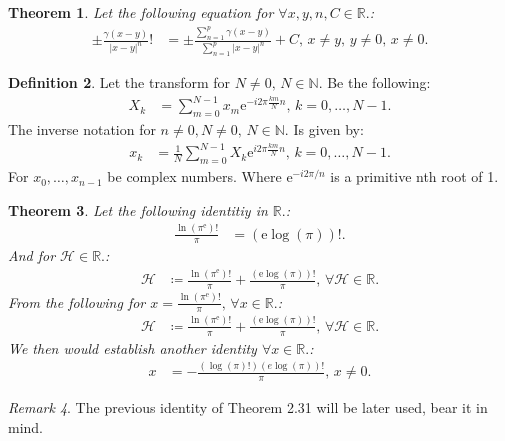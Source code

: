 \documentclass[10pt]{article}
\theoremstyle{plain}
\newtheorem{theorem}{Theorem}[section]
\theoremstyle{definition}
\newtheorem{definition}[theorem]{Definition}
\theoremstyle{remark}
\newtheorem{remark}[theorem]{Remark}
\begin{document}
\begin{theorem}
	Let the following equation for $\forall x, y, n, C \in \mathbb{R}.$:
	\begin{align*}
		\pm \frac{\gamma(x-y)}{|x - y|^{n}}! &= \pm \frac{\sum_{n=1}^{p}\gamma(x-y)}{\sum_{n=1}^{p}|x - y|^{n}} + C, \, x \neq y, \, y \neq 0, \, x \neq 0.
	\end{align*}
\end{theorem}

\begin{definition}
	Let the transform for $N \neq 0, \, N \in \mathbb{N}.$ Be the following:
	\begin{align*}
		X_k &= \sum_{m=0}^{N-1} x_{m}\mathrm{e}^{-i2\pi \frac{km}{N}n}, \, k = 0,\dots,N-1.
	\end{align*}
	The inverse notation for $n \neq 0, N \neq 0, \, N \in \mathbb{N}.$ Is given by:
	\begin{align*}
		x_k &= \frac{1}{N} \sum_{m=0}^{N-1} X_k \mathrm{e}^{i2\pi \frac{km}{N}n}, \, k = 0,\dots,N-1.
	\end{align*}
	For $x_{0}, \dots, x_{n-1}$ be complex numbers. Where $\mathrm{e}^{-i2\pi /n}$ is a primitive nth root of 1.
\end{definition}

\begin{theorem}
	Let the following identitiy in $\mathbb{R}.$:
	\begin{align*}
		\frac{\ln(\pi^\mathrm{e})!}{\pi} &= (\mathrm{e} \log(\pi))!.
	\end{align*}
	And for $\mathcal{H} \in \mathbb{R}.$:
	\begin{align*}
		\mathcal{H} &\coloneq \frac{\ln(\pi^\mathrm{e})!}{\pi} + \frac{(\mathrm{e} \log(\pi))!}{\pi}, \, \forall \mathcal{H} \in \mathbb{R}.
	\end{align*}
	From the following for $x = \frac{\ln(\pi^\mathrm{e})!}{\pi}, \, \forall x \in \mathbb{R}.$:
	\begin{align*}
	\mathcal{H} &\coloneq \frac{\ln(\pi^\mathrm{e})!}{\pi} + \frac{(\mathrm{e} \log(\pi))!}{\pi}, \, \forall \mathcal{H} \in \mathbb{R}.
	\end{align*}
	We then would establish another identity $\forall x \in \mathbb{R}.$:
	\begin{align*}
		x &= -\frac{(\log(\pi)!) (e \log(\pi))!}{\pi}, \, x \neq 0.
	\end{align*}
\end{theorem}
\begin{remark}
	The previous identity of Theorem 2.31 will be later used, bear it in mind.
\end{remark}
\end{document}
